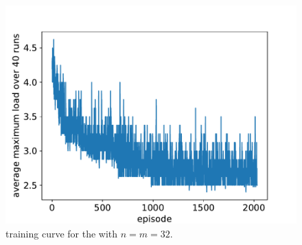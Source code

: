 \begin{figure}[h] 
    \centering
    \includegraphics[scale=0.6]{Chapter4/Figs/training_progression_hypercube_32_32.pdf}
    \caption{\GraphicalTwoChoice training curve for the \CycleGraph with $n=m=32$.}
    \label{graphical-two-choice-training-curve}
\end{figure}

